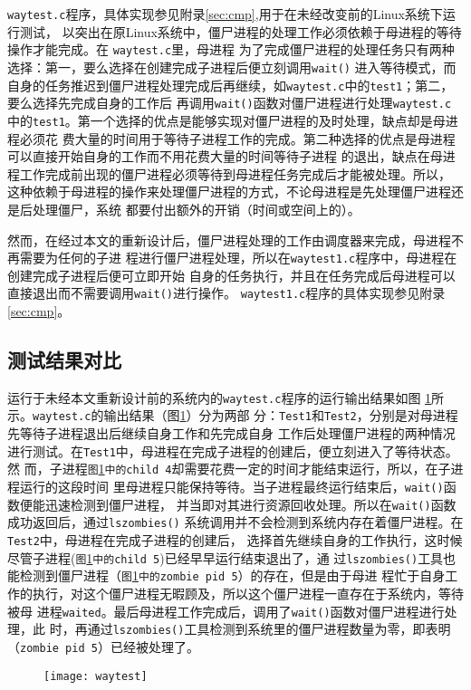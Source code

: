 \documentclass{swfuthesism}
\begin{document}
\texttt{waytest.c}程序，具体实现参见附录\ref{sec:cmp},用于在未经改变前的Linux系统下运行测试，
以突出在原Linux系统中，僵尸进程的处理工作必须依赖于母进程的等待操作才能完成。在
\texttt{waytest.c}里，母进程
为了完成僵尸进程的处理任务只有两种选择：第一，要么选择在创建完成子进程后便立刻调用\texttt{wait()}
进入等待模式，而自身的任务推迟到僵尸进程处理完成后再继续，如\texttt{waytest.c}中的\texttt{test1}；第二，要么选择先完成自身的工作后
再调用\texttt{wait()}函数对僵尸进程进行处理\texttt{waytest.c}中的\texttt{test1}。第一个选择的优点是能够实现对僵尸进程的及时处理，缺点却是母进程必须花
费大量的时间用于等待子进程工作的完成。第二种选择的优点是母进程可以直接开始自身的工作而不用花费大量的时间等待子进程
的退出，缺点在母进程工作完成前出现的僵尸进程必须等待到母进程任务完成后才能被处理。所以，
这种依赖于母进程的操作来处理僵尸进程的方式，不论母进程是先处理僵尸进程还是后处理僵尸，系统
都要付出额外的开销（时间或空间上的）。

然而，在经过本文的重新设计后，僵尸进程处理的工作由调度器来完成，母进程不再需要为任何的子进
程进行僵尸进程处理，所以在\texttt{waytest1.c}程序中，母进程在创建完成子进程后便可立即开始
自身的任务执行，并且在任务完成后母进程可以直接退出而不需要调用\texttt{wait()}进行操作。
\texttt{waytest1.c}程序的具体实现参见附录\ref{sec:cmp}。

\subsection{测试结果对比}

运行于未经本文重新设计前的系统内的\texttt{waytest.c}程序的运行输出结果如图
\ref{fig:waytest}所示。\texttt{waytest.c}的输出结果（图\ref{fig:waytest}）分为两部
分：\texttt{Test1}和\texttt{Test2}，分别是对母进程先等待子进程退出后继续自身工作和先完成自身
工作后处理僵尸进程的两种情况进行测试。在\texttt{Test1}中，母进程在完成子进程的创建后，便立刻进入了等待状态。然
而，子进程\texttt{图\ref{fig:waytest}中的child 4}却需要花费一定的时间才能结束运行，所以，在子进程运行的这段时间
里母进程只能保持等待。当子进程最终运行结束后，\texttt{wait()}函数便能迅速检测到僵尸进程，
并当即对其进行资源回收处理。所以在\texttt{wait()}函数成功返回后，通过\texttt{lszombies()}
系统调用并不会检测到系统内存在着僵尸进程。在\texttt{Test2}中，母进程在完成子进程的创建后，
选择首先继续自身的工作执行，这时候尽管子进程(\texttt{图\ref{fig:waytest}中的child 5})已经早早运行结束退出了，通
过\texttt{lszombies()}工具也能检测到僵尸进程（\texttt{图\ref{fig:waytest}中的zombie pid 5}）的存在，但是由于母进
程忙于自身工作的执行，对这个僵尸进程无暇顾及，所以这个僵尸进程一直存在于系统内，等待被母
进程\texttt{waited}。最后母进程工作完成后，调用了\texttt{wait()}函数对僵尸进程进行处理，此
时，再通过\texttt{lszombies()}工具检测到系统里的僵尸进程数量为零，即表明（\texttt{zombie
  pid 5}）已经被处理了。
\begin{figure}[!ht]
  \centering
  \texttt{[image: waytest]}
  \label{fig:waytest}
\end{figure}
\end{document}
